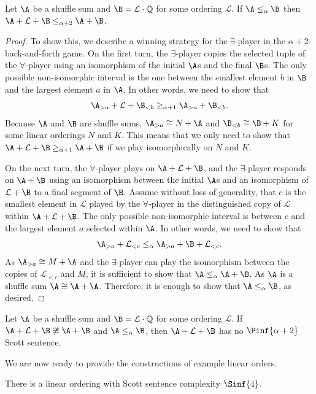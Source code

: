 \documentclass{amsart}
\newcommand{\Q}{\mathbb{Q}}
\renewcommand{\L}{\mathcal{L}}
\begin{document}
\begin{lemma}\label{lem:shufflesum}
Let $\A$ be a shuffle sum and $\B = \L\cdot\Q$ for some ordering $\L$. If
$\A\leq_\alpha \B$ then $\A+\L+\B\leq_{\alpha+2}\A+\B$.
\end{lemma}
\begin{proof}
To show this, we describe a winning strategy for the $\exists$-player in the
$\alpha+2$-back-and-forth game. 
On the first turn, the $\exists$-player copies the selected tuple of the
$\forall$-player using an isomorphism of the initial $\A$s and the final $\B$s. 
The only possible non-isomorphic interval is the one between the smallest
element $b$ in $\B$ and the largest element $a$ in $\A$. 
In other words, we need to show that 
\[\A_{>a}+\L+\B_{<b}\geq_{\alpha+1} \A_{>a}+\B_{<b}.\]
Because $\A$ and $\B$ are shuffle sums, $\A_{>a}\cong N+\A$ and $\B_{<b}\cong
\B+K$ for some linear orderings $N$ and $K$. 
This means that we only need to show that
$\A+\L+\B\geq_{\alpha+1}\A+\B$
if we play isomorphically on $N$ and $K$.

On the next turn, the $\forall$-player plays on $\A+\L+\B$, and the
$\exists$-player responds on $\A+\B$ using an isomorphism between the initial
$\A$s and an isomorphism of $\L+\B$ to a final segment of $\B$.
Assume without loss of generality, that $c$ is the smallest element in $\L$
played by the $\forall$-player in the distinguished copy of $\L$ within $\A+\L+\B$.
The only possible non-isomorphic interval is between $c$ and the
largest element $a$ selected within $\A$.
In other words, we need to show that 
\[\A_{>a}+\L_{<c}\leq_{\alpha} \A_{>a}+\B+\L_{<c}.\]
As $\A_{>a}\cong M+\A$ and the $\exists$-player can play the isomorphism between
the copies of $\L_{<c}$ and $M$, it is sufficient to show that $\A\leq_{\alpha}\A+\B$.
As $\A$ is a shuffle sum $\A\cong \A+\A$.
Therefore, it is enough to show that $\A\leq_\alpha \B$, as desired.
\end{proof}

\begin{corollary}\label{lower}
Let $\A$ be a shuffle sum and $\B = \L\cdot\Q$ for some ordering $\L$. If $\A+\L+\B\not\cong \A+\B$ and
$\A\leq_\alpha \B$, then $\A+\L+\B$ has no $\Pinf{\alpha+2}$ Scott sentence.
\end{corollary}

We are now ready to provide the constructions of example linear orders.

\begin{theorem}
There is a linear ordering with Scott sentence complexity $\Sinf{4}$.
\end{theorem}
\end{document}
